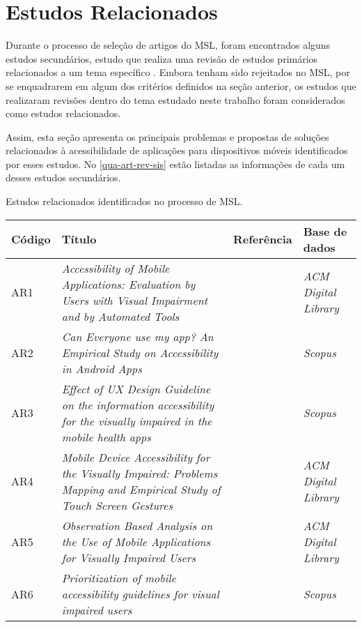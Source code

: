 \section{Estudos Relacionados}

Durante o processo de seleção de artigos do MSL, foram encontrados alguns estudos secundários, estudo que realiza uma revisão de estudos primários relacionados a um tema específico \cite{Kitchenham2007}.
Embora tenham sido rejeitados no MSL, por se enquadrarem em algum dos critérios definidos na seção anterior, os estudos que realizaram revisões dentro do tema estudado neste trabalho foram considerados como estudos relacionados.

Assim, esta seção apresenta os principais problemas e propostas de soluções relacionados à acessibilidade de aplicações para dispositivos móveis identificados por esses estudos.
No \autoref{qua-art-rev-sis} estão listadas as informações de cada um desses estudos secundários.

\begin{quadro}[htb!]
  \caption{\label{qua-art-rev-sis}Estudos relacionados identificados no processo de MSL.}
  \begin{tabular}{|m{1.2cm} | m{8.1cm} | m{2.7cm} | m{2.5cm}|}
    \hline
    \textbf{Código} & \textbf{Título}                                                                                                             & \textbf{Referência}  & \textbf{Base de dados}     \\
    \hline
    AR1             & \emph{Accessibility of Mobile Applications: Evaluation by Users with Visual Impairment and by Automated Tools}              & \cite{Mateus2020}    & \emph{ACM Digital Library} \\
    \hline
    AR2             & \emph{Can Everyone use my app? An Empirical Study on Accessibility in Android Apps}                                         & \cite{Vendome201941} & \emph{Scopus}              \\
    \hline
    AR3             & \emph{Effect of UX Design Guideline on the information accessibility for the visually impaired in the mobile health apps}   & \cite{Kim20191103}   & \emph{Scopus}              \\
    \hline
    AR4             & \emph{Mobile Device Accessibility for the Visually Impaired: Problems Mapping and Empirical Study of Touch Screen Gestures} & \cite{Damaceno2016}  & \emph{ACM Digital Library} \\
    \hline
    AR5             & \emph{Observation Based Analysis on the Use of Mobile Applications for Visually Impaired Users}                             & \cite{Siebra2016}    & \emph{ACM Digital Library} \\
    \hline
    AR6             & \emph{Prioritization of mobile accessibility guidelines for visual impaired users}                                          & \cite{Quispe2020}    & \emph{Scopus}              \\
    \hline
  \end{tabular}
\end{quadro}

